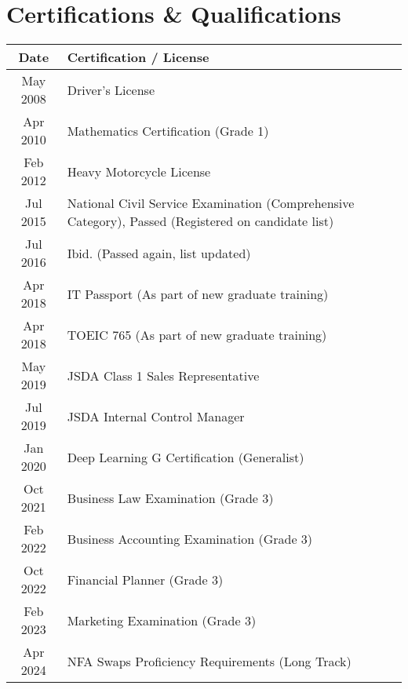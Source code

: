 \documentclass[uplatex,a4j,10.5pt,dvipdfmx]{jsarticle}
\begin{document}
\section*{Certifications \& Qualifications}

\begin{longtable}{|c|l|}
	\hline
	\centering\textbf{Date} & \textbf{Certification / License}                                                                   \\
	\hline
	\endhead

	\hline
	May 2008                & Driver's License                                                                                   \\
	\hline
	Apr 2010                & Mathematics Certification (Grade 1)                                                                \\
	\hline
	Feb 2012                & Heavy Motorcycle License                                                                           \\
	\hline
	Jul 2015                & National Civil Service Examination (Comprehensive Category), Passed (Registered on candidate list) \\
	\hline
	Jul 2016                & Ibid. (Passed again, list updated)                                                                 \\
	\hline
	Apr 2018                & IT Passport (As part of new graduate training)                                                     \\
	\hline
	Apr 2018                & TOEIC 765 (As part of new graduate training)                                                       \\
	\hline
	May 2019                & JSDA Class 1 Sales Representative                                                                  \\
	\hline
	Jul 2019                & JSDA Internal Control Manager                                                                      \\
	\hline
	Jan 2020                & Deep Learning G Certification (Generalist)                                                         \\
	\hline
	Oct 2021                & Business Law Examination (Grade 3)                                                                 \\
	\hline
	Feb 2022                & Business Accounting Examination (Grade 3)                                                          \\
	\hline
	Oct 2022                & Financial Planner (Grade 3)                                                                        \\
	\hline
	Feb 2023                & Marketing Examination (Grade 3)                                                                    \\
	\hline
	Apr 2024                & NFA Swaps Proficiency Requirements (Long Track)                                                    \\
	\hline
\end{longtable}
\end{document}
